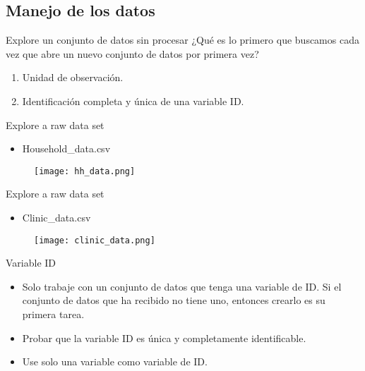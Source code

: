 \documentclass[11pt, aspectratio=169, compress]{beamer}
\begin{document}
\subsection{Manejo de los datos}
\begin{frame}{Explore un conjunto de datos sin procesar}
	¿Qué es lo primero que buscamos cada vez que abre un nuevo conjunto de datos por primera vez?

	\begin{enumerate}
		\item Unidad de observación.
		\item Identificación completa y única de una variable ID. 
	\end{enumerate}
\end{frame}
\begin{frame}{Explore a raw data set}
	\begin{itemize}
		\item Household\_data.csv
	\end{itemize}
	\begin{figure}[H]
		\centering
		\texttt{[image: hh\_data.png]}
	\end{figure}
\end{frame}
\begin{frame}{Explore a raw data set}
	\begin{itemize}
		\item Clinic\_data.csv
	\end{itemize}
	\begin{figure}[H]
		\centering
		\texttt{[image: clinic\_data.png]}
	\end{figure}
\end{frame}
\begin{frame}{Variable ID}
	\begin{itemize}
		\item Solo trabaje con un conjunto de datos que tenga una variable de ID. Si el conjunto de datos que ha recibido no tiene uno, entonces crearlo es su primera tarea.
		\item Probar que la variable ID es única y completamente identificable.
		\item Use solo una variable como variable de ID.
	\end{itemize}
\end{frame}
\end{document}

